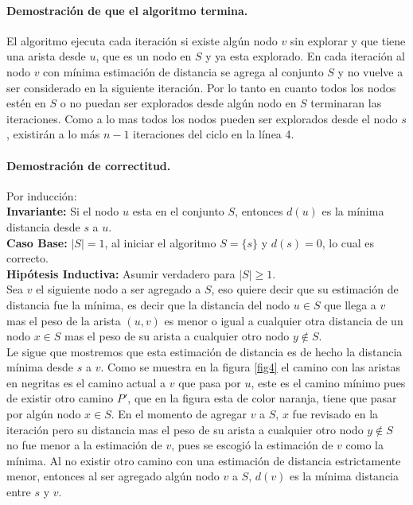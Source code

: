\documentclass[12pt]{article}
\begin{document}
\paragraph{Demostración de que el algoritmo termina.}
El algoritmo ejecuta cada iteración si existe algún nodo $v$ sin explorar y que tiene una arista desde $u$, que es un nodo en $S$ y ya esta explorado. En cada iteración al nodo $v$ con mínima estimación de distancia se agrega al conjunto $S$ y no vuelve a ser considerado en la siguiente iteración. Por lo tanto en cuanto todos los nodos estén en $S$ o no puedan ser explorados desde algún nodo en $S$ terminaran las iteraciones. Como a lo mas todos los nodos pueden ser explorados desde el nodo $s$, existirán a lo más $n - 1$ iteraciones del ciclo en la línea 4.
 \paragraph{Demostración de correctitud.} Por inducción:\\
 \textbf{Invariante:} Si el nodo $u$ esta en el conjunto $S$, entonces $d(u)$ es la mínima distancia desde $s$ a $u$.\\
  \textbf{Caso Base:} $|S|=1$, al iniciar el algoritmo $S=\{s\}$ y $d(s) =0$, lo cual es correcto.\\
  \textbf{Hipótesis Inductiva:} Asumir verdadero para $|S|\geq 1$.\\
  Sea $v$ el siguiente nodo a ser agregado a $S$, eso quiere decir que su estimación de distancia fue la mínima, es decir que la distancia del nodo  $u\in S$ que llega a $v$ mas el peso de la arista $(u,v)$ es menor o igual a cualquier otra distancia de un nodo $x\in S$ mas el peso de su arista a cualquier otro nodo $y\notin S$.\\
  Le sigue que mostremos que esta estimación de distancia es de hecho la distancia mínima desde $s$ a $v$. Como se muestra en la figura \ref{fig4} el camino con las aristas en negritas es el camino actual a $v$ que pasa por $u$, este es el camino mínimo pues de existir otro camino $P'$, que en la figura esta de color naranja, tiene que pasar por algún nodo $x\in S$. En el momento de agregar $v$ a $S$, $x$ fue revisado en la iteración pero su distancia mas el peso de su arista a cualquier otro nodo $y\notin S$ no fue menor a la estimación de $v$, pues se escogió la estimación de $v$ como la mínima. Al no existir otro camino con una estimación de distancia estrictamente menor, entonces al ser agregado algún nodo $v$ a $S$,  $d(v)$ es la mínima distancia entre $s$ y $v$.
\end{document}
